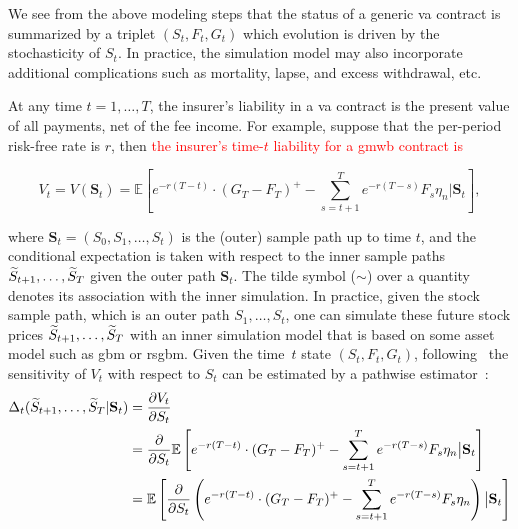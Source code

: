 We see from the above modeling steps that the status of a generic \gls{va} contract is summarized by a triplet $(S_t,F_t,G_t)$ which evolution is driven by the stochasticity of $S_t$.
In practice, the simulation model may also incorporate additional complications such as mortality, lapse, and excess withdrawal, etc.

At any time $t=1,\ldots,T$, the insurer's liability in a \gls{va} contract is the present value of all payments, net of the fee income.
For example, suppose that the per-period risk-free rate is $r$, then
\textcolor{red}{the insurer's time-$t$ liability for a \gls{gmwb} contract is}

\begin{equation} \label{eq2:liability-gmwb}
    V_t = V(\mathbf{S}_t) = \mathbb{E} \left[ e^{-r(T-t)}\cdot (G_T - F_T)^+ - \sum_{s=t+1}^{T} e^{-r(T-s)} F_s \eta_n \big\vert \mathbf{S}_t \right],
\end{equation}

where $\mathbf{S}_t = (S_0, S_1, \ldots, S_t)$ is the (outer) sample path up to time $t$, and the conditional expectation is taken with respect to the inner sample paths $\widetilde{S}_{t+1},\ldots,\widetilde{S}_{T}$ given the outer path $\mathbf{S}_t$.
The tilde symbol ($\sim$) over a quantity denotes its association with the inner simulation.
In practice, given the stock sample path, which is an outer path $S_1,\ldots,S_t$, one can simulate these future stock prices $\widetilde{S}_{t+1},\ldots,\widetilde{S}_{T}$ with an inner simulation model that is based on some asset model such as \gls{gbm} or \gls{rsgbm}.
Given the time~$t$ state $(S_t,F_t,G_t)$, following~\cite{cathcart2015calculating} the sensitivity of $V_t$ with respect to $S_t$ can be estimated by a pathwise estimator~\citep{glasserman2004monte}:
\begin{align}\label{eq2:delta}
    \Delta_t(\widetilde{S}_{t+1},\ldots,\widetilde{S}_{T} | \mathbf{S}_t) 
    & = \frac{\partial V_t}{\partial S_t} \nonumber \\
    & = \frac{\partial}{\partial S_t} \mathbb{E} \left[ e^{-r(T-t)}\cdot (G_T - F_T)^+ - \sum_{s=t+1}^{T} e^{-r(T-s)} F_s \eta_n \big\vert \mathbf{S}_t \right] \nonumber \\
    & = \mathbb{E} \left[ \frac{\partial}{\partial S_t} \left( e^{-r(T-t)}\cdot (G_T - F_T)^+ - \sum_{s=t+1}^{T} e^{-r(T-s)} F_s \eta_n \right) \big\vert \mathbf{S}_t \right] 
\end{align}

